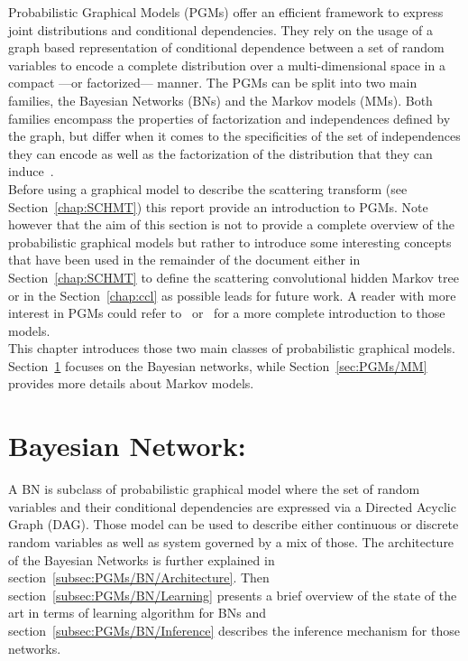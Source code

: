 \documentclass[a4paper,11pt]{report}
\begin{document}
  Probabilistic Graphical Models (PGMs) offer an efficient framework to express joint distributions and conditional dependencies. They rely on the usage of a graph based representation of conditional dependence between a set of random variables to encode a complete distribution over a multi-dimensional space in a compact ---or factorized--- manner. The PGMs can be split into two main families, the Bayesian Networks (BNs) and the Markov models (MMs). Both families encompass the properties of factorization and independences defined by the graph, but differ when it comes to the specificities of the set of independences they can encode as well as the factorization of the distribution that they can induce~\citep{bishop2006pattern}.\\
  
  Before using a graphical model to describe the scattering transform (see Section~\ref{chap:SCHMT}) this report provide an introduction to PGMs. Note however that the aim of this section is not to provide a complete overview of the probabilistic graphical models but rather to introduce some interesting concepts that have been used in the remainder of the document either in Section~\ref{chap:SCHMT} to define the scattering convolutional hidden Markov tree or in the Section~\ref{chap:ccl} as possible leads for future work. A reader with more interest in PGMs could refer to~\citep{heckerman1998tutorial} or~\citep{bishop2006pattern} for a more complete introduction to those models.\\
  
  This chapter introduces those two main classes of probabilistic graphical models. Section~\ref{sec:PGMs/BN} focuses on the Bayesian networks, while Section~\ref{sec:PGMs/MM} provides more details about Markov models.
	
  \section{Bayesian Network:}  
    \label{sec:PGMs/BN}
    A BN is subclass of probabilistic graphical model where the set of random variables and their conditional dependencies are expressed via a Directed Acyclic Graph (DAG). Those model can be used to describe either continuous or discrete random variables as well as system governed by a mix of those. The architecture of the Bayesian Networks is further explained in section~\ref{subsec:PGMs/BN/Architecture}. Then section~\ref{subsec:PGMs/BN/Learning} presents a brief overview of the state of the art in terms of learning algorithm for BNs and section~\ref{subsec:PGMs/BN/Inference} describes the inference mechanism for those networks.
        
\end{document}

